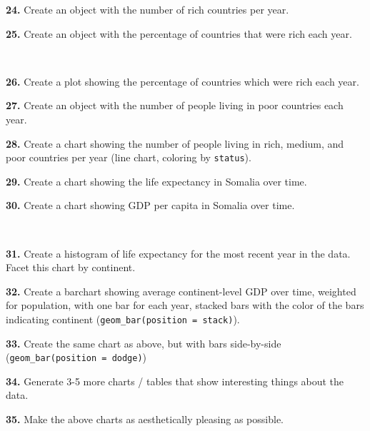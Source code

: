 \documentclass[
]{book}
\begin{document}
\textbf{24.} Create an object with the number of rich countries per year.

\textbf{25.} Create an object with the percentage of countries that were rich each year.

~

\textbf{26.} Create a plot showing the percentage of countries which were rich each year.

\textbf{27.} Create an object with the number of people living in poor countries each year.

\textbf{28.} Create a chart showing the number of people living in rich, medium, and poor countries per year (line chart, coloring by \texttt{status}).

\textbf{29.} Create a chart showing the life expectancy in Somalia over time.

\textbf{30.} Create a chart showing GDP per capita in Somalia over time.

~

\textbf{31.} Create a histogram of life expectancy for the most recent year in the data. Facet this chart by continent.

\textbf{32.} Create a barchart showing average continent-level GDP over time, weighted for population, with one bar for each year, stacked bars with the color of the bars indicating continent (\texttt{geom\_bar(position\ =\ \textquotesingle{}stack\textquotesingle{})}).

\textbf{33.} Create the same chart as above, but with bars side-by-side (\texttt{geom\_bar(position\ =\ \textquotesingle{}dodge\textquotesingle{})})

\textbf{34.} Generate 3-5 more charts / tables that show interesting things about the data.

\textbf{35.} Make the above charts as aesthetically pleasing as possible.

  
\end{document}
